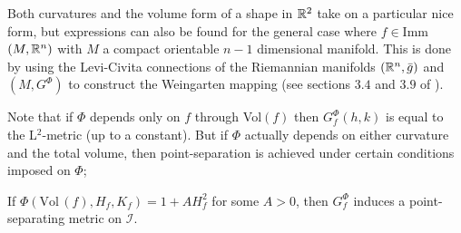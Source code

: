 \begin{remark}
Both curvatures and the volume form of a shape in $\mathbb{R}^2$ take on a particular nice form, but expressions can also be found for the general case where $f \in$Imm$(M, \mathbb{R}^n)$ with $M$ a compact orientable $n-1$ dimensional manifold. This is done by using the Levi-Civita connections of the Riemannian manifolds $(\mathbb{R}^n,\bar{g})$ and $(M,G^\Phi)$ to construct the Weingarten mapping (see sections $3.4$ and $3.9$ of \cite{bauer2010almost}).
\end{remark}
Note that if $\Phi$ depends only on $f$ through Vol$(f)$ then $G_f^\Phi (h,k)$ is equal to the L$^2$-metric (up to a constant). But if $\Phi$ actually depends on either curvature and the total volume, then point-separation is achieved under certain conditions imposed on $\Phi$;

\begin{theorem}\label{point_sep}
If $\Phi(\text{Vol} \, (f), H_f, K_f) = 1 + A H_f^2$ for some $A > 0$, then $G_f^\Phi$ induces a point-separating metric on $\mathcal{I}$.
\end{theorem}

